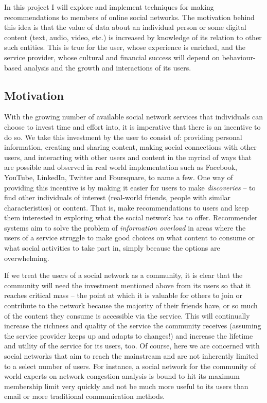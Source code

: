 In this project I will explore and implement techniques for making recommendations to members of online social networks. The motivation behind this idea is that the value of data about an individual person or some digital content (text, audio, video, etc.) is increased by knowledge of its relation to other such entities. This is true for the user, whose experience is enriched, and the service provider, whose cultural and financial success will depend on behaviour-based analysis and the growth and interactions of its users.

\subsection*{Motivation}

With the growing number of available social network services that individuals can choose to invest time and effort into, it is imperative that there is an incentive to do so. We take this investment by the user to consist of: providing personal information, creating and sharing content, making social connections with other users, and interacting with other users and content in the myriad of ways that are possible and observed in real world implementation such as Facebook, YouTube, LinkedIn, Twitter and Foursquare, to name a few. One way of providing this incentive is by making it easier for users to make \emph{discoveries} -- to find other individuals of interest (real-world friends, people with similar characteristics) or content. That is, make recommendations to users and keep them interested in exploring what the social network has to offer. Recommender systems aim to solve the problem of \emph{information overload} in areas where the users of a service struggle to make good choices on what content to consume or what social activities to take part in, simply because the options are overwhelming.

If we treat the users of a social network as a community, it is clear that the community will need the investment mentioned above from its users so that it reaches critical mass -- the point at which it is valuable for others to join or contribute to the network because the majority of their friends have, or so much of the content they consume is accessible via the service. This will continually increase the richness and quality of the service the community receives (assuming the service provider keeps up and adapts to changes!) and increase the lifetime and utility of the service for its users, too. Of course, here we are concerned with social networks that aim to reach the mainstream and are not inherently limited to a select number of users. For instance, a social network for the community of world experts on network congestion analysis is bound to hit its maximum membership limit very quickly and not be much more useful to its users than email or more traditional communication methods.

